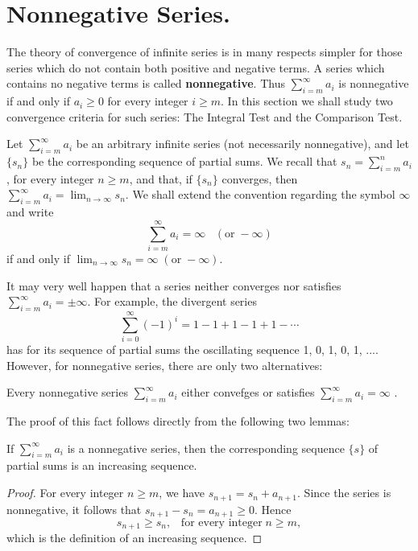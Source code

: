 \section{Nonnegative Series.} The theory of convergence of infinite series is in many respects simpler for those series which do not contain both positive and negative terms. A series which contains no negative terms is called \textbf{nonnegative}. Thus $\sum_{i=m}^\infty a_i$ is nonnegative if and only if $a_i \geq 0$ for every integer $i \geq m$. In this section we shall study two convergence criteria for such series: The Integral Test and the Comparison Test.

Let $\sum_{i=m}^\infty a_i$ be an arbitrary infinite series (not necessarily nonnegative), and let $\{ s_n \}$ be the corresponding sequence of partial sums. We recall that $s_n = \sum_{i=m}^n a_i$, for every integer $n \geq m$, and that, if $\{ s_n \}$ converges, then $\sum_{i=m}^\infty a_i = \lim_{n \rightarrow \infty} s_n$. We shall extend the convention regarding the symbol $\infty$ and write  
$$
\sum_{i=m}^{\infty} a_i = \infty \;\;\;(\mbox{or}\; -\infty)
$$
\noindent if and only if $\lim_{n \rightarrow \infty} s_n = \infty \; (\mbox{or}\; - \infty)$. 

It may very well happen that a series neither converges nor satisfies $\sum_{i=m}^{\infty} a_i = \pm \infty$. For example, the divergent series
$$
\sum_{i=0}^{\infty} (-1)^i = 1 - 1 + 1 - 1 + 1 - \cdots
$$
\noindent has for its sequence of partial sums the oscillating sequence 1, 0, 1, 0, 1, .... However, for nonnegative series, there are only two alternatives:

\begin{theorem} %
Every nonnegative series $\sum_{i=m}^{\infty} a_i$ either convefges or satisfies $\sum_{i=m}^{\infty} a_i = \infty$ .
\end{theorem}

The proof of this fact follows directly from the following two lemmas:

\begin{theorem} %
If $\sum_{i=m}^{\infty} a_i$ is a nonnegative series, then the corresponding sequence $\{s\}$ of partial sums is an increasing sequence.
\end{theorem}

\begin{proof}
For every integer $n \geq m$, we have $s_{n+1} = s_n + a_{n+1}$. Since the series is nonnegative, it follows that $s_{n+1} - s_n = a_{n+1} \geq 0$. Hence
$$
s_{n+1} \geq s_n, \;\;\;\mbox{for every integer}\; n \geq m, 
$$
which is the definition of an increasing sequence.
\end{proof}

